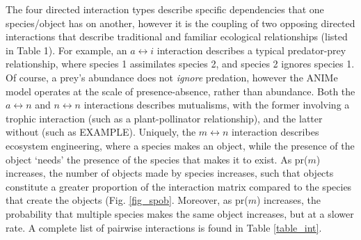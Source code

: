 \documentclass[twocolumn,preprintnumbers,amsmath,amssymb,superscriptaddress]{revtex4}
\begin{document}
The four directed interaction types describe specific dependencies that one species/object has on another, however it is the coupling of two opposing directed interactions that describe traditional and familiar ecological relationships (listed in Table 1).
For example, an $a \leftrightarrow i$ interaction describes a typical predator-prey relationship, where species 1 assimilates species 2, and species 2 ignores species 1.
Of course, a prey's abundance does not \emph{ignore} predation, however the ANIMe model operates at the scale of presence-absence, rather than abundance.
Both the $a \leftrightarrow n$ and $n \leftrightarrow n$ interactions describes mutualisms, with the former involving a trophic interaction (such as a plant-pollinator relationship), and the latter without (such as EXAMPLE).
Uniquely, the $m \leftrightarrow n$ interaction describes ecosystem engineering, where a species makes an object, while the presence of the object `needs' the presence of the species that makes it to exist.
As pr($m$) increases, the number of objects made by species increases, such that objects constitute a greater proportion of the interaction matrix compared to the species that create the objects (Fig. \ref{fig_spob}.
Moreover, as pr($m$) increases, the probability that multiple species makes the same object increases, but at a slower rate.
A complete list of pairwise interactions is found in Table \ref{table_int}.


\end{document}
